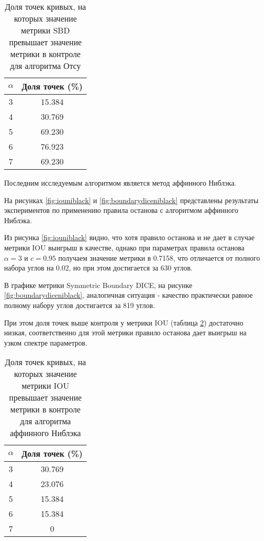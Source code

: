 \begin{table}[H]
\centering
\caption{Доля точек кривых, на которых значение метрики SBD превышает значение метрики в  контроле для алгоритма Отсу}
\label{tab:otsusbd}
\begin{tabular}{|c|c|}
\hline
\(\alpha\) & Доля точек (\%) \\
\hline
3 & 15.384 \\
4 & 30.769 \\
5 & 69.230 \\
6 & 76.923 \\
7 & 69.230 \\
\hline
\end{tabular}
\end{table}

Последним исследуемым алгоритмом является метод аффинного Ниблэка.

На рисунках \ref*{fig:iouniblack} и \ref*{fig:boundarydiceniblack} представлены результаты экспериментов по применению правила останова с алгоритмом аффинного Ниблэка.

Из рисунка \ref*{fig:iouniblack} видно, что хотя правило останова и не дает в случае метрики IOU выигрыш в качестве, однако при параметрах правила останова \(\alpha = 3\) и \(c = 0.95\) получаем значение метрики в 0.7158, что отличается от полного набора углов на 0.02, но при этом достигается за 630 углов.

В графике метрики Symmetric Boundary DICE, на рисунке \ref*{fig:boundarydiceniblack}, аналогичная ситуация - качество практически равное полному набору углов достигается за 819 углов.

При этом доля точек выше контроля у метрики IOU (таблица \ref*{tab:niblackiou}) достаточно низкая, соответственно для этой метрики правило останова дает выигрыш на узком спектре параметров.



\begin{table}[H]
\centering
\caption{Доля точек кривых, на которых значение метрики IOU превышает значение метрики в  контроле для алгоритма аффинного Ниблэка}
\label{tab:niblackiou}
\begin{tabular}{|c|c|}
\hline
\(\alpha\) & Доля точек (\%) \\
\hline
3 & 30.769 \\
4 & 23.076 \\
5 & 15.384 \\
6 & 15.384 \\
7 &  0 \\
\hline
\end{tabular}
\end{table}

